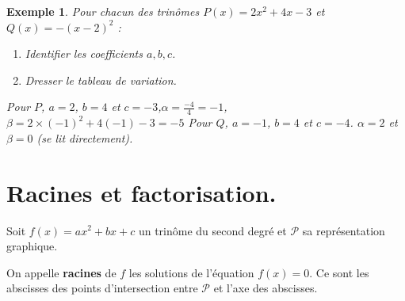 \documentclass[a4paper,11pt]{article}
\theoremstyle{break}
\newcounter{enonce}
\newtheorem{exemple}[enonce]{Exemple}
\begin{document}
    
 \begin{exemple}
   Pour chacun des trinômes $P(x) = 2x^2+4x-3$ et $Q(x)=-(x-2)^2$ : 
   \begin{enumerate}
    \item Identifier les coefficients $a,b,c$.
    \item Dresser le tableau de variation.
  \end{enumerate}
  
  Pour $P$, $a=2$, $b=4$ et $c=-3$,$\alpha=\frac{-4}{4}=-1$, $\beta=2 \times (-1)^2+4(-1)-3=-5$
  Pour $Q$, $a=-1$, $b=4$ et $c=-4$. $\alpha=2$ et $\beta=0$ (se lit directement).
   \begin{multicols}{2}
   
      
%	
   
   \columnbreak 
   
   
   \end{multicols}
 \end{exemple}


     
     \section{Racines et factorisation.}
    
  
  \begin{definition}
    Soit $f(x)=ax^2+bx+c$ un trinôme du second degré et $\mathcal{P}$ sa représentation 
    graphique.
    
    On appelle \textbf{racines} de $f$ les solutions de l'équation $f(x)=0$. Ce sont les 
    abscisses des points d'intersection entre $\mathcal{P}$ et l'axe des abscisses.
    
  \end{definition}
  
\end{document}
